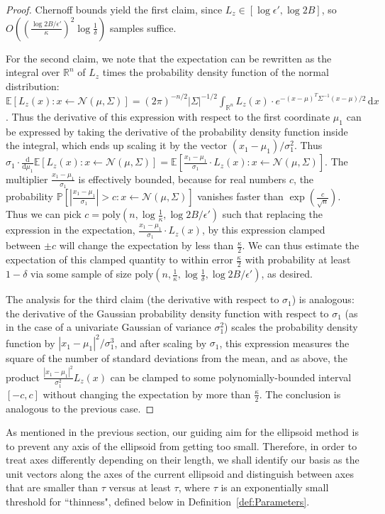 \documentclass[11pt,letter]{article}
\renewcommand{\Pr}{\mathbb{P}}
\newcommand{\Exp}{\mathbb{E}}
\renewcommand{\poly}{\mathrm{poly}}
\renewcommand{\d}{\mathrm{d}}
\newcommand{\Diff}[2][]{\frac{\d#1}{\d#2}}
\numberwithin{nTheorems}{section}
\begin{document}
\begin{proof}

Chernoff bounds yield the first claim, since $L_z\in [\log\epsilon',\log 2B]$, so $O((\frac{\log 2B/\epsilon'}{\kappa})^2\log \frac{1}{\delta})$ samples suffice.

For the second claim, we note that the expectation can be rewritten as the integral over $\mathbb{R}^n$ of $L_z$ times the probability density function of the normal distribution: $\Exp[L_z(x):x\leftarrow \mathcal{N}(\mu,\Sigma)]=(2\pi)^{-n/2}|\Sigma|^{-1/2}\int_{\mathbb{R}^n} L_z(x)\cdot e^{-(x-\mu)^T\Sigma^{-1}(x-\mu)/2}\,\d x$. Thus the derivative of this expression with respect to the first coordinate $\mu_1$ can be expressed by taking the derivative of the probability density function inside the integral, which ends up scaling it by the vector $(x_1-\mu_1)/\sigma_1^2$. Thus $\sigma_1\cdot\Diff{\mu_1} \Exp[L_z(x):x\leftarrow \mathcal{N}(\mu,\Sigma)]=\Exp[\frac{x_1-\mu_1}{\sigma_1}\cdot L_z(x):x\leftarrow \mathcal{N}(\mu,\Sigma)]$. The multiplier $\frac{x_1-\mu_1}{\sigma_1}$ is effectively bounded, because for real numbers $c$, the probability $\Pr[\left|\frac{x_1-\mu_1}{\sigma_1}\right|>c:x\leftarrow\mathcal{N}(\mu,\Sigma)]$ vanishes faster than $\exp(\frac{c}{\sqrt{n}})$. Thus we can pick $c=\poly(n,\log \frac{1}{\kappa},\log 2B/\epsilon')$ such that replacing the expression in the expectation, $\frac{x_1-\mu_1}{\sigma_1}\cdot L_z(x)$, by this expression clamped between $\pm c$ will change the expectation by less than $\frac{\kappa}{2}$. We can thus estimate the expectation of this clamped quantity to within error $\frac{\kappa}{2}$ with probability at least $1-\delta$ via some sample of size $\poly(n,\frac{1}{\kappa},\log\frac{1}{\delta},\log 2B/\epsilon')$, as desired.

The analysis for the third claim (the derivative with respect to $\sigma_1$) is analogous: the derivative of the Gaussian probability density function with respect to $\sigma_1$ (as in the case of a univariate Gaussian of variance $\sigma_1^2$) scales the probability density function by $|x_1-\mu_1|^2/\sigma_1^3$, and after scaling by $\sigma_1$, this expression measures the square of the number of standard deviations from the mean, and as above, the product $\frac{|x_1-\mu_1|^2}{\sigma_1^2} L_z(x)$ can be clamped to some polynomially-bounded interval $[-c,c]$ without changing the expectation by more than $\frac{\kappa}{2}$. The conclusion is analogous to the previous case.
\end{proof}
As mentioned in the previous section, our guiding aim for the ellipsoid method is to prevent any axis of the ellipsoid from getting too small.
Therefore, in order to treat axes differently depending on their length, we shall identify our basis as the unit vectors along the axes of the current ellipsoid and distinguish between axes that are smaller than $\tau$ versus at least $\tau$, where $\tau$ is an exponentially small threshold for ``thinness", defined below in Definition~\ref{def:Parameters}.
\end{document}
